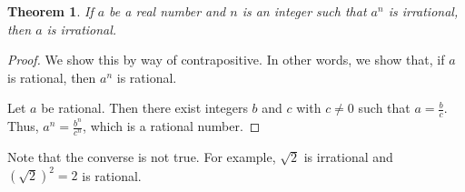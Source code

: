 \documentclass[12pt]{article}
\newtheorem*{thm*}{Theorem}
\begin{document}
\begin{thm*}
If $a$ be a real number and $n$ is an integer such that $a^n$ is irrational, then $a$ is irrational.
\end{thm*}

\begin{proof}
We show this by way of contrapositive.  In other words, we show that, if $a$ is rational, then $a^n$ is rational.

Let $a$ be rational.  Then there exist integers $b$ and $c$ with $c\neq 0$ such that $\displaystyle a=\frac{b}{c}$.  Thus, $\displaystyle a^n=\frac{b^n}{c^n}$, which is a rational number.
\end{proof}

Note that the converse is not true.  For example, $\sqrt{2}$ is irrational and $\left(\sqrt{2}\right)^2=2$ is rational.
\end{document}
